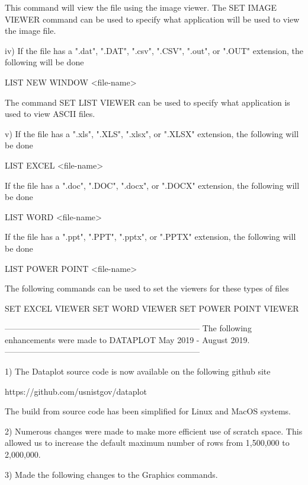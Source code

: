              This command will view the file using the image viewer.  The
              SET IMAGE VIEWER command can be used to specify what
              application will be used to view the image file.

          iv) If the file has a ".dat", ".DAT", ".csv", ".CSV", ".out",
              or ".OUT" extension, the following will be done

                  LIST NEW WINDOW  <file-name>

              The command SET LIST VIEWER can be used to specify what
              application is used to view ASCII files.

           v) If the file has a ".xls", ".XLS", ".xlsx", or ".XLSX"
              extension, the following will be done

                  LIST EXCEL  <file-name>

              If the file has a ".doc", ".DOC", ".docx", or ".DOCX"
              extension, the following will be done

                  LIST WORD  <file-name>

              If the file has a ".ppt", ".PPT", ".pptx", or ".PPTX"
              extension, the following will be done

                  LIST POWER POINT  <file-name>

              The following commands can be used to set the viewers
              for these types of files

                  SET EXCEL VIEWER
                  SET WORD VIEWER
                  SET POWER POINT VIEWER

-----------------------------------------------------------------------
The following enhancements were made to DATAPLOT
May 2019 - August 2019.
-----------------------------------------------------------------------

 1) The Dataplot source code is now available on the following
    github site

        https://github.com/usnistgov/dataplot

    The build from source code has been simplified for Linux and
    MacOS systems.

 2) Numerous changes were made to make more efficient use of scratch
    space.  This allowed us to increase the default maximum number of
    rows from 1,500,000 to 2,000,000.

 3) Made the following changes to the Graphics commands.

